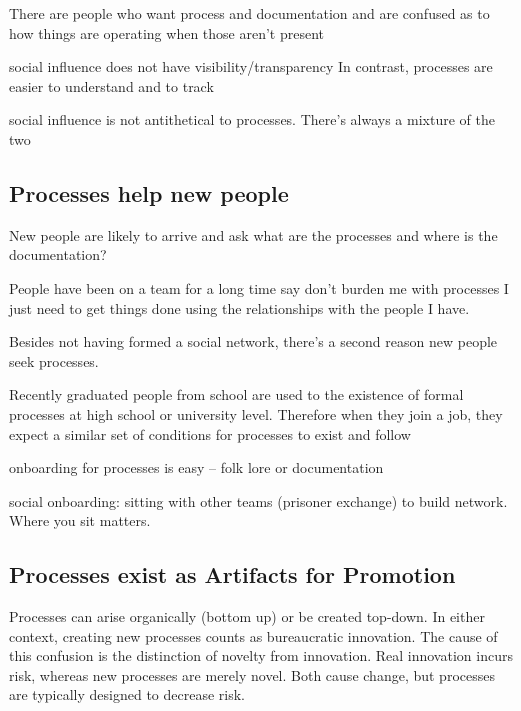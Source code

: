 There are people who want process and documentation and are confused as to how things are operating when those aren't present

social influence does not have visibility/transparency
In contrast, processes are easier to understand and to track

social influence is not antithetical to processes. There's always a mixture of the two


\subsection*{Processes help new people}

New people are likely to arrive and ask what are the processes and where is the documentation?

People have been on a team for a long time say don't burden me with processes I just need to get things done using the relationships with the people I have.

Besides not having formed a social network, there's a second reason new people seek processes.

Recently graduated people from school are used to the existence of formal processes at high school or university level. Therefore when they join a job, they expect a similar set of conditions for processes to exist and follow

onboarding for processes is easy -- folk lore or documentation

social onboarding: sitting with other teams (prisoner exchange) to build network.
Where you sit matters.

\subsection*{Processes exist as Artifacts for Promotion}

Processes can arise organically (bottom up) or be created top-down. In either context, creating new processes counts as bureaucratic innovation. The cause of this confusion is the distinction of novelty from innovation. Real innovation incurs risk, whereas new processes are merely novel. Both cause change, but processes are typically designed to decrease risk. 


